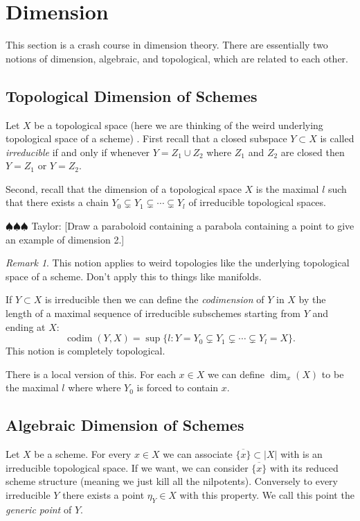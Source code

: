 \documentclass[12pt]{article}
\numberwithin{equation}{section}
\theoremstyle{definition}
\theoremstyle{remark}
\newtheorem{remark}[theorem]{Remark}
\newcommand{\codim}{\operatorname{codim}}
\newcommand{\taylor}[1]{{\color{blue} \sf $\spadesuit\spadesuit\spadesuit$ Taylor: [#1]}}
\begin{document}
\section{Dimension}
This section is a crash course in dimension theory. 
There are essentially two notions of dimension, algebraic, and topological, which are related to each other. 
\subsection{Topological Dimension of Schemes}

Let $X$ be a topological space (here we are thinking of the weird underlying topological space of a scheme) . First recall that a closed subspace $Y\subset X$ is called \emph{irreducible} if and only if whenever $Y = Z_1 \cup Z_2$ where $Z_1$ and $Z_2$ are closed then $Y=Z_1$ or $Y=Z_2$.

Second, recall that the dimension of a topological space $X$ is the maximal $l$ such that there exists a chain $Y_0 \subsetneq Y_1 \subsetneq \cdots \subsetneq Y_l$ of irreducible topological spaces. 

\taylor{Draw a paraboloid containing a parabola containing a point to give an example of dimension 2.}

\begin{remark}
	This notion applies to weird topologies like the underlying topological space of a scheme. Don't apply this to things like manifolds. 
\end{remark}


If $Y \subset X$ is irreducible then we can define the \emph{codimension} of $Y$ in $X$ by the length of a maximal sequence of irreducible subschemes starting from $Y$ and ending at $X$:
$$ \codim(Y,X) = \sup \lbrace l \colon Y=Y_0 \subsetneq Y_1 \subsetneq \cdots \subsetneq Y_l = X \rbrace. $$
This notion is completely topological. 

There is a local version of this. 
For each $x \in X$ we can define $\dim_x(X)$ to be the maximal $l$ where where $Y_0$ is forced to contain $x$.

\subsection{Algebraic Dimension of Schemes}
Let $X$ be a scheme. 
For every $x \in X$ we can associate $\overline{\lbrace x\rbrace} \subset \vert X \vert$ with is an irreducible topological space. 
If we want, we can consider $\overline{\lbrace x \rbrace}$ with its reduced scheme structure (meaning we just kill all the nilpotents). 
Conversely to every irreducible $Y$ there exists a point $\eta_Y \in X$ with this property. 
We call this point the \emph{generic point} of $Y$. 
\end{document}

